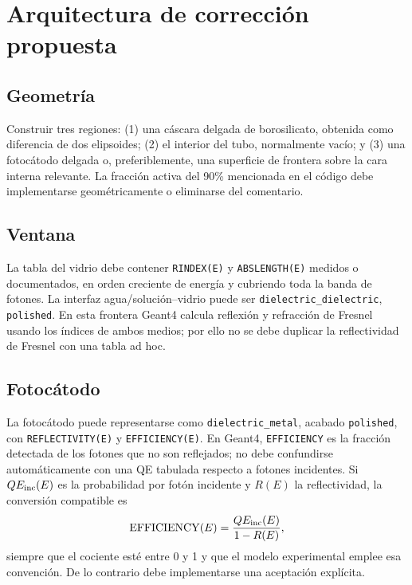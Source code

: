 \documentclass[11pt,a4paper]{article}
\begin{document}
\section{Arquitectura de corrección propuesta}
\subsection{Geometría}
Construir tres regiones: (1) una cáscara delgada de borosilicato, obtenida como
diferencia de dos elipsoides; (2) el interior del tubo, normalmente vacío; y
(3) una fotocátodo delgada o, preferiblemente, una superficie de frontera sobre
la cara interna relevante. La fracción activa del 90\% mencionada en el código
debe implementarse geométricamente o eliminarse del comentario.

\subsection{Ventana}
La tabla del vidrio debe contener \texttt{RINDEX(E)} y
\texttt{ABSLENGTH(E)} medidos o documentados, en orden creciente de energía y
cubriendo toda la banda de fotones. La interfaz agua/solución--vidrio puede ser
\texttt{dielectric\_dielectric}, \texttt{polished}. En esta frontera Geant4
calcula reflexión y refracción de Fresnel usando los índices de ambos medios;
por ello no se debe duplicar la reflectividad de Fresnel con una tabla ad hoc.

\subsection{Fotocátodo}
La fotocátodo puede representarse como \texttt{dielectric\_metal}, acabado
\texttt{polished}, con \texttt{REFLECTIVITY(E)} y \texttt{EFFICIENCY(E)}.
En Geant4, \texttt{EFFICIENCY} es la fracción detectada de los fotones que no
son reflejados; no debe confundirse automáticamente con una QE tabulada respecto
a fotones incidentes. Si $QE_{\rm inc}(E)$ es la probabilidad por fotón incidente
y $R(E)$ la reflectividad, la conversión compatible es
\[
  \mathrm{EFFICIENCY}(E)=\frac{QE_{\rm inc}(E)}{1-R(E)},
\]
siempre que el cociente esté entre 0 y 1 y que el modelo experimental emplee
esa convención. De lo contrario debe implementarse una aceptación explícita.
\end{document}
